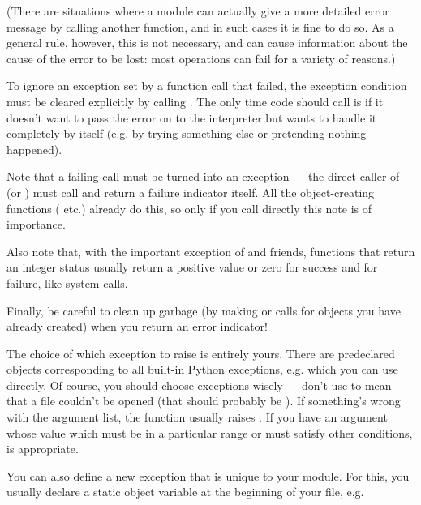\documentclass{manual}
\begin{document}
(There are situations where a module can actually give a more detailed
error message by calling another  function, and in
such cases it is fine to do so.  As a general rule, however, this is
not necessary, and can cause information about the cause of the error
to be lost: most operations can fail for a variety of reasons.)

To ignore an exception set by a function call that failed, the exception
condition must be cleared explicitly by calling . 
The only time \C{} code should call  is if it doesn't
want to pass the error on to the interpreter but wants to handle it
completely by itself (e.g. by trying something else or pretending
nothing happened).

Note that a failing  call must be turned into an
exception --- the direct caller of  (or
) must call  and
return a failure indicator itself.  All the object-creating functions
( etc.) already do this, so only if you
call  directly this note is of importance.

Also note that, with the important exception of
 and friends, functions that return an
integer status usually return a positive value or zero for success and
 for failure, like \UNIX{} system calls.

Finally, be careful to clean up garbage (by making
 or  calls for objects
you have already created) when you return an error indicator!

The choice of which exception to raise is entirely yours.  There are
predeclared \C{} objects corresponding to all built-in Python exceptions,
e.g.  which you can use directly.  Of
course, you should choose exceptions wisely --- don't use
 to mean that a file couldn't be opened (that
should probably be ).  If something's wrong with
the argument list, the  function usually
raises .  If you have an argument whose value
which must be in a particular range or must satisfy other conditions,
 is appropriate.

You can also define a new exception that is unique to your module.
For this, you usually declare a static object variable at the
beginning of your file, e.g.
\end{document}
